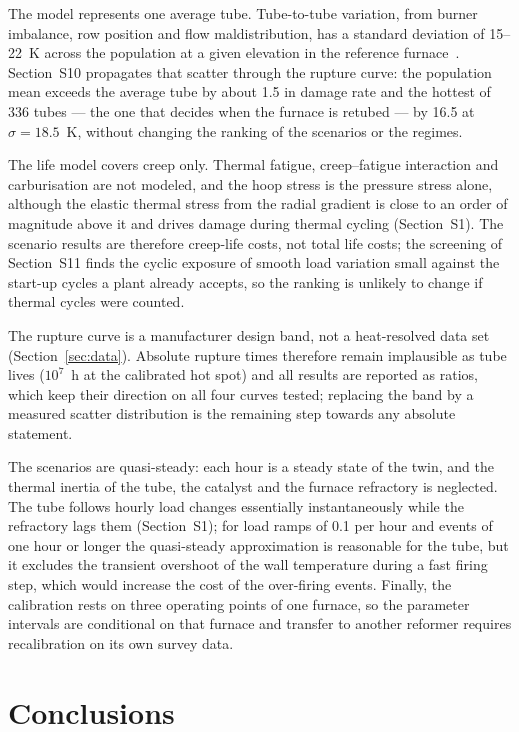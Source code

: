 \documentclass[final,3p,times]{elsarticle}
\begin{document}
The model represents one average tube. Tube-to-tube variation, from burner imbalance, row position and flow maldistribution, has a standard deviation of 15--22~K across the population at a given elevation in the reference furnace~\cite{latham2011}. Section~S10 propagates that scatter through the rupture curve: the population mean exceeds the average tube by about 1.5 in damage rate and the hottest of 336 tubes --- the one that decides when the furnace is retubed --- by 16.5 at $\sigma = 18.5$~K, without changing the ranking of the scenarios or the regimes.

The life model covers creep only. Thermal fatigue, creep--fatigue interaction and carburisation are not modeled, and the hoop stress is the pressure stress alone, although the elastic thermal stress from the radial gradient is close to an order of magnitude above it and drives damage during thermal cycling (Section~S1). The scenario results are therefore creep-life costs, not total life costs; the screening of Section~S11 finds the cyclic exposure of smooth load variation small against the start-up cycles a plant already accepts, so the ranking is unlikely to change if thermal cycles were counted.

The rupture curve is a manufacturer design band, not a heat-resolved data set (Section~\ref{sec:data}). Absolute rupture times therefore remain implausible as tube lives ($10^7$~h at the calibrated hot spot) and all results are reported as ratios, which keep their direction on all four curves tested; replacing the band by a measured scatter distribution is the remaining step towards any absolute statement.

The scenarios are quasi-steady: each hour is a steady state of the twin, and the thermal inertia of the tube, the catalyst and the furnace refractory is neglected. The tube follows hourly load changes essentially instantaneously while the refractory lags them (Section~S1); for load ramps of 0.1 per hour and events of one hour or longer the quasi-steady approximation is reasonable for the tube, but it excludes the transient overshoot of the wall temperature during a fast firing step, which would increase the cost of the over-firing events. Finally, the calibration rests on three operating points of one furnace, so the parameter intervals are conditional on that furnace and transfer to another reformer requires recalibration on its own survey data.

\section{Conclusions}
\label{sec:conclusions}
\end{document}
